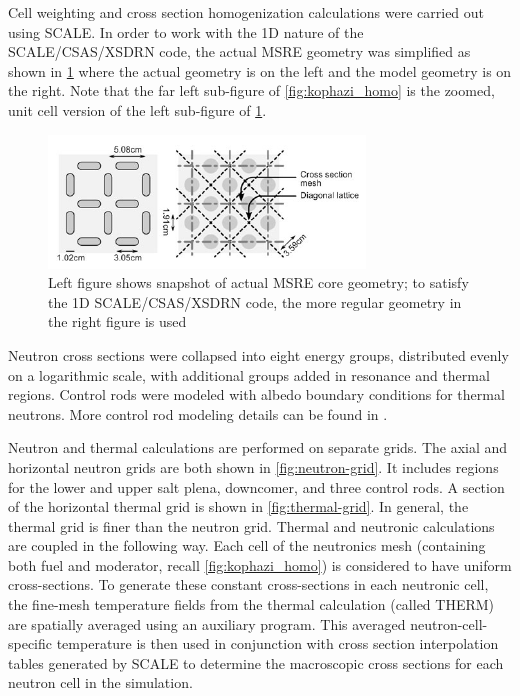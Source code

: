 \documentclass{article}
\begin{document}
Cell weighting and cross section homogenization calculations were carried out
using SCALE. In order to work with the 1D nature of the SCALE/CSAS/XSDRN code,
the actual \gls{MSRE} geometry was simplified as shown in \cref{fig:real-vs-model}
where the actual geometry is on the left and the model geometry is on the
right. Note that the far left sub-figure of \cref{fig:kophazi_homo} is the
zoomed, unit cell version of the left sub-figure of \cref{fig:real-vs-model}.

\begin{figure}[htpb]
  \centering
  \includegraphics[max height=.5\textheight,max width=\textwidth,keepaspectratio]{kophazi-actual-vs-model-core-geometry.png}
  \caption{Left figure shows snapshot of actual \gls{MSRE} core geometry; to satisfy
    the 1D SCALE/CSAS/XSDRN code, the more regular geometry in the right figure
    is used \cite{kophazi_development_2009}}
  \label{fig:real-vs-model}
\end{figure}

Neutron cross sections were collapsed into eight energy groups, distributed
evenly on a logarithmic scale, with additional groups added in resonance and
thermal regions. Control rods were modeled with albedo boundary conditions for
thermal neutrons. More control rod modeling details can be found in
\cite{kophazi_development_2009}.

Neutron and thermal calculations are performed on separate grids. The axial and
horizontal neutron grids are both shown in \cref{fig:neutron-grid}. It includes
regions for the lower and upper salt plena, downcomer, and three control rods. A
section of the horizontal thermal grid is shown in \cref{fig:thermal-grid}. In
general, the thermal grid is finer than the neutron grid. Thermal and neutronic
calculations are coupled in the following way. Each cell of the neutronics mesh
(containing both fuel and moderator, recall \cref{fig:kophazi_homo}) is
considered to have uniform cross-sections. To generate these constant
cross-sections in each neutronic cell, the fine-mesh temperature fields from
the thermal calculation (called THERM) are spatially averaged using an auxiliary
program. This averaged neutron-cell-specific temperature is then used in
conjunction with cross section interpolation tables generated by SCALE to
determine the macroscopic cross sections for each neutron cell in the
simulation.
\end{document}
